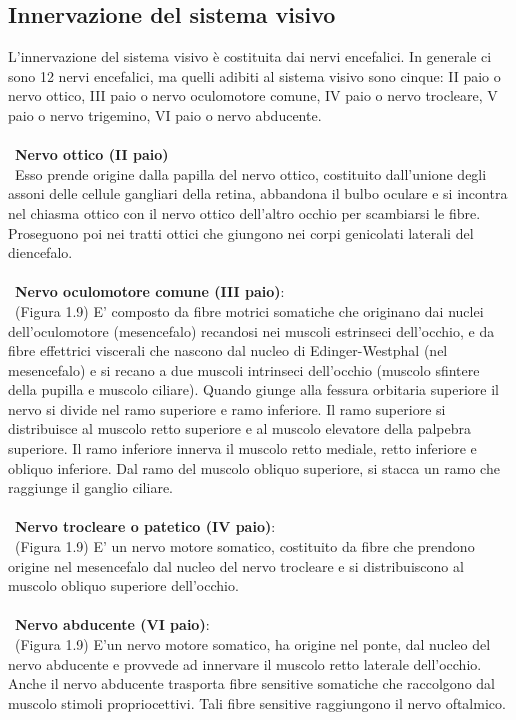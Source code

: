   
\subsection{Innervazione del sistema visivo}

L’innervazione del sistema visivo è costituita dai nervi encefalici. In generale ci sono 12 nervi encefalici, ma quelli adibiti al sistema visivo sono cinque: II paio o nervo ottico, III paio o nervo oculomotore comune, IV paio o nervo trocleare, V paio o nervo trigemino, VI paio o nervo abducente\cite{bib3}.
\\\ \\\
\textbf{Nervo ottico (II paio)}
\\\ 
Esso prende origine dalla papilla del nervo ottico, costituito dall’unione degli assoni delle cellule gangliari della retina, abbandona il bulbo oculare e si incontra nel chiasma ottico con il nervo ottico dell'altro occhio per scambiarsi le fibre. Proseguono poi nei tratti ottici che giungono nei corpi genicolati laterali del diencefalo.
\\\ \\\
\textbf{Nervo oculomotore comune (III paio)}: 
\\\ 
(Figura 1.9) E' composto da fibre motrici somatiche che originano dai nuclei dell’oculomotore (mesencefalo) recandosi nei muscoli estrinseci dell’occhio, e da fibre effettrici 	viscerali che nascono dal nucleo di Edinger-Westphal (nel mesencefalo) e si recano a due muscoli intrinseci dell’occhio (muscolo sfintere della pupilla e muscolo ciliare). Quando giunge alla fessura orbitaria superiore il nervo si divide nel ramo superiore e ramo inferiore. Il ramo superiore si distribuisce al muscolo retto superiore e al muscolo elevatore della palpebra superiore. Il ramo inferiore innerva il muscolo retto mediale, retto inferiore e obliquo inferiore. Dal ramo del muscolo obliquo superiore, si stacca un ramo che raggiunge il ganglio ciliare.
\\\ \\\
\textbf{Nervo trocleare o patetico (IV paio)}: 
\\\ 
(Figura 1.9) E' un nervo motore somatico, costituito da fibre che prendono origine nel mesencefalo dal nucleo del nervo trocleare e si distribuiscono al muscolo obliquo superiore dell’occhio.
\\\ \\\
\textbf{Nervo abducente (VI paio)}: 
\\\ 
(Figura 1.9) E'un nervo motore somatico, ha origine nel ponte, dal nucleo del nervo abducente e provvede ad innervare il muscolo retto laterale dell’occhio. Anche il nervo abducente trasporta fibre sensitive somatiche che raccolgono dal muscolo stimoli propriocettivi. Tali fibre sensitive raggiungono il nervo oftalmico.
